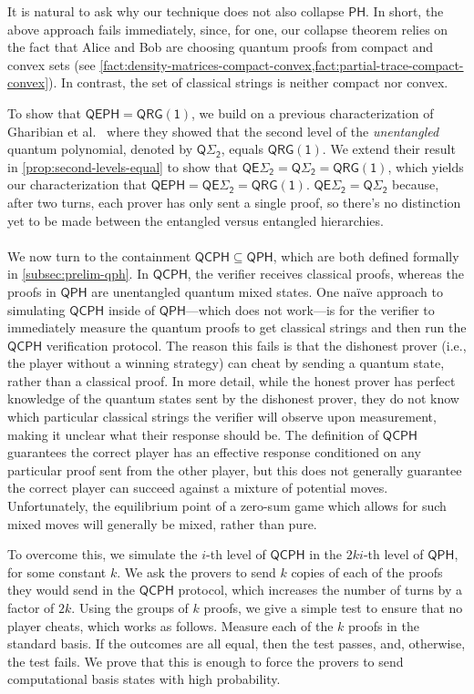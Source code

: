 \documentclass[10pt,a4paper]{article}
\theoremstyle{definition}
\newcommand{\class}[1]{\ensuremath{\mathsf{#1}}\xspace}
\newcommand{\QRGk}[1][k]{\class{QRG(#1)}}
\newcommand{\QRGone}{\QRGk[1]}
\newcommand{\PH}{\class{PH}}
\newcommand{\QCPH}{\class{QCPH}}
\newcommand{\QPH}{\class{QPH}}
\newcommand{\QSigmai}[1][i]{\class{Q\Sigma_{#1}}}
\newcommand{\QEPH}{\class{QEPH}}
\newcommand{\entQSigmai}[1][i]{\class{QE\Sigma_{#1}}}
\begin{document}
It is natural to ask why 
our technique does not also collapse $\PH$. In short, the above approach fails immediately, since, for one, our collapse theorem relies on the fact that Alice and Bob are choosing quantum proofs from compact and convex sets (see \cref{fact:density-matrices-compact-convex,fact:partial-trace-compact-convex}). 
In contrast, the set of classical strings is neither compact nor convex. 

To show that $\QEPH = \QRGone$, we build on a previous characterization of Gharibian et al.\ \cite{GSSSY22_qph} where they showed that the second level of the \emph{unentangled} quantum polynomial, denoted by $\QSigmai[2]$, equals $\QRGone$. 
We extend their result in \cref{prop:second-levels-equal} to show that $\entQSigmai[2] = \QSigmai[2]=\QRGone$, which yields our characterization that $\QEPH = \entQSigmai[2]=\QRGone$. 
$\entQSigmai[2] = \QSigmai[2]$ because, after two turns, each prover has only sent a single proof, so there's no distinction yet to be made between the entangled versus entangled hierarchies.  


\paragraph{}
We now turn to the containment $\QCPH \subseteq \QPH$, which are both defined formally in \cref{subsec:prelim-qph}.
In $\QCPH$, the verifier receives classical proofs, whereas the proofs in $\QPH$ are unentangled quantum mixed states.
One na\"ive approach to simulating $\QCPH$ inside of $\QPH$---which does not work---is for the verifier to immediately measure the quantum proofs to get classical strings and then run the $\QCPH$ verification protocol. 
The reason this fails is that the dishonest prover (i.e., the player without a winning strategy) can cheat by sending a quantum state, rather than a classical proof. 
In more detail, while the honest prover has perfect knowledge of the quantum states sent by the dishonest prover, they do not know which particular classical strings the verifier will observe upon measurement, making it unclear what their response should be.
The definition of $\QCPH$ guarantees the correct player has an effective response conditioned on any particular proof sent from the other player, but this does not generally guarantee the correct player can succeed against a mixture of potential moves.
Unfortunately, the equilibrium point of a zero-sum game which allows for such mixed moves will generally be mixed, rather than pure.

To overcome this, we simulate the $i$-th level of $\QCPH$ in the $2ki$-th level of $\QPH$, for some constant $k$. 
We ask the provers to send $k$ copies of each of the proofs they would send in the $\QCPH$ protocol, which increases the number of turns by a factor of $2k$. 
Using the groups of $k$ proofs, we give a simple test to ensure that no player cheats, which works as follows. 
Measure each of the $k$ proofs in the standard basis. 
If the outcomes are all equal, then the test passes, and, otherwise, the test fails. 
We prove that this is enough to force the provers to send computational basis states with high probability. 
\end{document}
